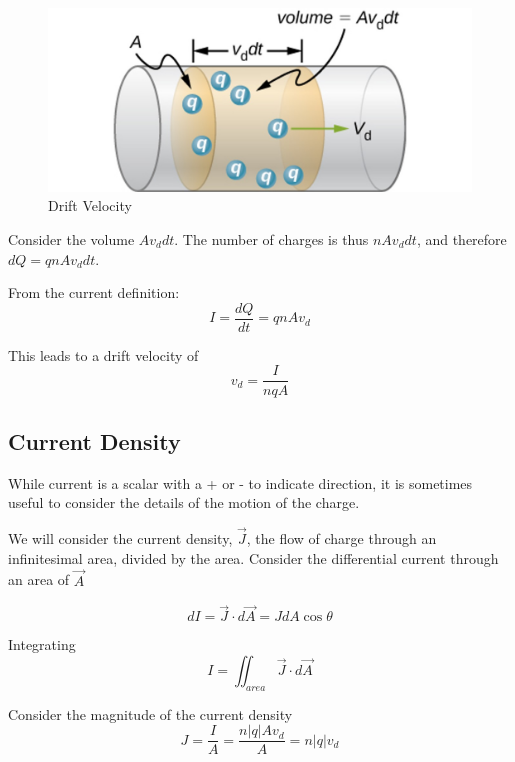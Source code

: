 \documentclass[14pt]{memoir}
\begin{document}
\begin{figure}[H]
\begin{center}
\includegraphics[scale=0.50]{fig/fig_09_10.jpg}
\caption{Drift Velocity}
\label{fig:09_10}
\end{center}
\end{figure}

Consider the volume $A v_d dt$. The number of charges is thus $n A v_d dt$, and therefore $dQ = q n A v_d dt$.

From the current definition: 
\begin{equation}
I = \frac{dQ}{dt} = q n A v_d
\end{equation}

This leads to a drift velocity of
\begin{equation}
v_d = \frac{I}{nqA}
\end{equation}


\subsection{Current Density}

While current is a scalar with a + or - to indicate direction, it is sometimes useful to consider the details of the motion of the charge. 

We will consider the current density, $\vec{J}$, the flow of charge through an infinitesimal area, divided by the area. Consider the differential current through an area of $\vec{A}$

\begin{equation}
dI = \vec{J} \cdot d\vec{A} = J dA \cos{\theta}
\end{equation}

Integrating
\begin{equation}
I = \iint_{area} \vec{J} \cdot d\vec{A}
\end{equation}

Consider the magnitude of the current density
\begin{equation}
J = \frac{I}{A} = \frac{n |q| A v_d}{A} = n |q| v_d
\end{equation}
\end{document}
